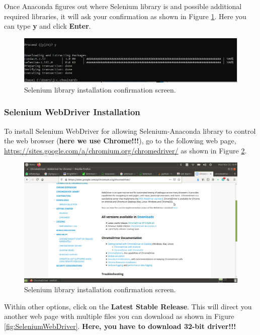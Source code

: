 Once Anaconda figures out where Selenium library is and possible additional required
libraries, it will ask your confirmation as shown in Figure
\ref{fig:SeleniumAnacondaConfirm}. Here you can type \textbf{y} and click \textbf{Enter}.

\begin{figure}[H]
    \centering
    \includegraphics[angle=0,origin=c,width = .8\linewidth]{Section_Ethernet/Figures/confirm-screen.jpg}
    \caption{Selenium library installation confirmation screen.}
    \label{fig:SeleniumAnacondaConfirm}
\end{figure}

\subsubsection{Selenium WebDriver Installation}
To install Selenium WebDriver for allowing Selenium-Anaconda library to control the
web browser (\textbf{here we use Chrome!!!}), go to the following web page, 
\url{https://sites.google.com/a/chromium.org/chromedriver/} as shown in Figure
\ref{fig:WebDriverDownload}. 
\begin{figure}[H]
    \centering
    \includegraphics[angle=0,origin=c,width = .8\linewidth]{Section_Ethernet/Figures/WebDriverDownload.png}
    \caption{Selenium library installation confirmation screen.}
    \label{fig:WebDriverDownload}
\end{figure}

Within other options, click on the \textbf{Latest Stable Release}. This will direct you 
another web page with multiple files you can download as shown in Figure
\ref{fig:SeleniumWebDriver}. \textbf{Here, you have to download 32-bit driver!!!}

